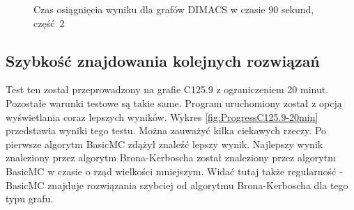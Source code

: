 \documentclass[12pt, a4paper]{article}
\begin{document}
\begin{figure}[H]
  \begin{center}
  \end{center}
  \caption{Czas osiągnięcia wyniku dla grafów DIMACS w czasie 90 sekund, część 2}
  \label{fig:dimacs-best-time-part2}
\end{figure}


\subsection{Szybkość znajdowania kolejnych rozwiązań}
Test ten został przeprowadzony na grafie C125.9 z ograniczeniem 20 minut. Pozostałe warunki testowe są takie same. Program uruchomiony został z opcją wyświetlania coraz lepszych wyników. Wykres \ref{fig:ProgressC125.9-20min} przedstawia wyniki tego testu. Można zauważyć kilka ciekawych rzeczy. Po pierwsze algorytm BasicMC zdążył znaleźć lepszy wynik. Najlepszy wynik znaleziony przez algorytm Brona-Kerboscha został znaleziony przez algorytm BasicMC w czasie o rząd wielkości mniejszym. Widać tutaj także regularność - BasicMC znajduje rozwiązania szybciej od algorytmu Brona-Kerboscha dla tego typu grafu.
\end{document}
